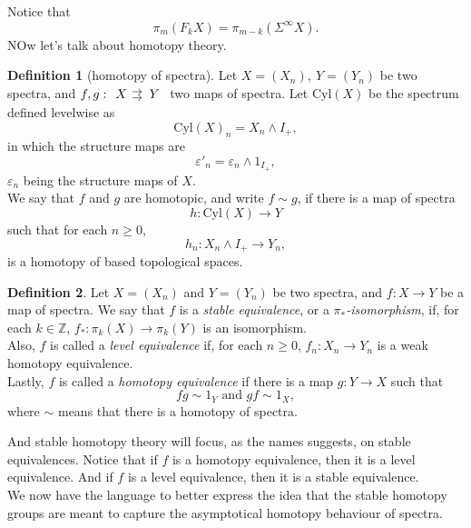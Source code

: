 \documentclass[a4paper,english,11pt]{article}
\theoremstyle{definition}
\newtheorem{Def}{Definition}
\theoremstyle{plain}
\theoremstyle{remark}
\newcommand{\Susp}{\Sigma^{\infty}}
\newcommand{\Cyl}{\text{Cyl}}
\begin{document}
Notice that
\[\pi_m(F_kX)=\pi_{m-k}(\Susp X).\]
NOw let's talk about homotopy theory.
\begin{Def}[homotopy of spectra]
  Let \(X=(X_n),\ Y=(Y_n)\) be two spectra, and \(f,g:\begin{tikzcd}[column sep =0.9em] X\arrow[shift left=1, shorten >=1.5]{r}\arrow[shift right=1, shorten >=1.5]{r}& Y \end{tikzcd}\) two maps of spectra. Let \(\Cyl(X)\) be the spectrum defined levelwise as 
  \[\Cyl(X)_n=X_n\wedge I_{+},\]
  in which the structure maps are
  \[\varepsilon'_n=\varepsilon_n\wedge 1_{I_{+}},\]
  \(\varepsilon_n\) being the structure maps of \(X\).\\

  We say that \(f\) and \(g\) are homotopic, and write \(f\sim g\), if there is a map of spectra
  \[h:\Cyl(X)\to Y\]
  such that for each \(n\geq 0\),
  \[h_n:X_n\wedge I_{+}\to Y_n,\]
  is a homotopy of based topological spaces.
\end{Def}
\begin{Def}
  Let \(X=(X_n)\) and \(Y=(Y_n)\) be two spectra, and \(f:X\to Y\) be a map of spectra. We say that \(f\) is a \textit{stable equivalence}, or a \textit{\(\pi_\ast\)-isomorphism}, if, for each \(k\in\mathbb{Z}\), \(f_*:\pi_k(X)\to\pi_k(Y)\) is an isomorphism.\\

  Also, \(f\) is called a \textit{level equivalence} if, for each \(n\geq 0\), \(f_n:X_n\to Y_n\) is a weak homotopy equivalence.\\
  
  Lastly, \(f\) is called a \textit{homotopy equivalence} if there is a map \(g:Y\to X\) such that
  \[fg\sim 1_Y \text{ and } gf\sim 1_X,\]
  where \(\sim\) means that there is a homotopy of spectra.
\end{Def}
And stable homotopy theory will focus, as the names suggests, on stable equivalences. 
Notice that if \(f\) is a homotopy equivalence, then it is a level equivalence. And if \(f\) is a level equivalence, then it is a stable equivalence.\\

We now have the language to better express the idea that the stable homotopy groups are meant to capture the asymptotical homotopy behaviour of spectra.
\end{document}
